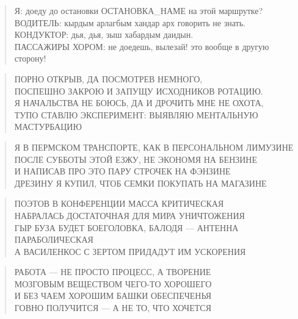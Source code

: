 \poemtitle{***}
\begin{verse}
Я: доеду до остановки ОСТАНОВКА\_НАМЕ на этой маршрутке?\\
ВОДИТЕЛЬ: кырдым арлагбым хандар арх говорить не знать.\\
КОНДУКТОР: дья, дья, зыш хабардым даидын.\\
ПАССАЖИРЫ ХОРОМ: не доедешь, вылезай! это вообще в другую сторону!
\end{verse}

\poemtitle{***}
\begin{verse}
ПОРНО ОТКРЫВ, ДА ПОСМОТРЕВ НЕМНОГО,\\
ПОСПЕШНО ЗАКРОЮ И ЗАПУЩУ ИСХОДНИКОВ РОТАЦИЮ.\\
Я НАЧАЛЬСТВА НЕ БОЮСЬ, ДА И ДРОЧИТЬ МНЕ НЕ ОХОТА,\\
ТУПО СТАВЛЮ ЭКСПЕРИМЕНТ: ВЫЯВЛЯЮ МЕНТАЛЬНУЮ МАСТУРБАЦИЮ
\end{verse}

\poemtitle{***}
\begin{verse}
Я В ПЕРМСКОМ ТРАНСПОРТЕ, КАК В ПЕРСОНАЛЬНОМ ЛИМУЗИНЕ\\
ПОСЛЕ СУББОТЫ ЭТОЙ ЕЗЖУ, НЕ ЭКОНОМЯ НА БЕНЗИНЕ\\
И НАПИСАВ ПРО ЭТО ПАРУ СТРОЧЕК НА ФЭНЗИНЕ\\
ДРЕЗИНУ Я КУПИЛ, ЧТОБ СЕМКИ ПОКУПАТЬ НА МАГАЗИНЕ
\end{verse}

\poemtitle{***}
\begin{verse}
ПОЭТОВ В КОНФЕРЕНЦИИ МАССА КРИТИЧЕСКАЯ\\
НАБРАЛАСЬ ДОСТАТОЧНАЯ ДЛЯ МИРА УНИЧТОЖЕНИЯ\\
ГЫР БУЗА БУДЕТ БОЕГОЛОВКА, БАЛОДЯ — АНТЕННА ПАРАБОЛИЧЕСКАЯ\\
А ВАСИЛЕНКОС С ЗЕРТОМ ПРИДАДУТ ИМ УСКОРЕНИЯ
\end{verse}

\poemtitle{***}
\begin{verse}
РАБОТА — НЕ ПРОСТО ПРОЦЕСС, А ТВОРЕНИЕ\\
МОЗГОВЫМ ВЕЩЕСТВОМ ЧЕГО-ТО ХОРОШЕГО\\
И БЕЗ ЧАЕМ ХОРОШИМ БАШКИ ОБЕСПЕЧЕНЬЯ\\
ГОВНО ПОЛУЧИТСЯ — А НЕ ТО, ЧТО ХОЧЕТСЯ
\end{verse}

